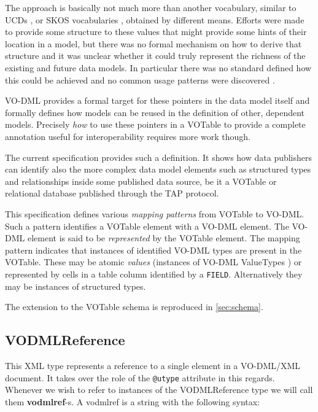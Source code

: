 \documentclass[11pt,a4paper]{ivoa}
\begin{document}
The approach is basically not much more than another vocabulary, similar
to UCDs \cite{2018ivoa.spec.0527M}, or SKOS vocabularies \cite{2009ivoa.spec.1007G}, obtained by
different means. Efforts were made to provide some structure to these
values that might provide some hints of their location in a model, but
there was no formal mechanism on how to derive that structure and it was
unclear whether it could truly represent the richness of the existing
and future data models. In particular there was no standard defined how
this could be achieved and no common usage patterns were discovered
\cite{note:utypeusage}.

VO-DML provides a formal target for these pointers in the data model
itself and formally defines how models can be reused in the definition
of other, dependent models. Precisely \emph{how} to use these pointers
in a VOTable to provide a complete annotation useful for
interoperability requires more work though.

The current specification provides such a definition. It shows how data
publishers can identify also the more complex data model elements such
as structured types and relationships inside some published data source,
be it a VOTable or relational database published through the TAP
protocol.

This specification defines various \emph{mapping patterns} from VOTable
to VO-DML. Such a pattern identifies a VOTable element with a VO-DML
element. The VO-DML element is said to be \emph{represented} by the
VOTable element. The mapping pattern indicates that instances of
identified VO-DML types are present in the VOTable. These may be atomic
\emph{values} (instances of VO-DML ValueTypes \cite{2018ivoa.spec.0910L}) or
represented by cells in a table column identified by a \texttt{FIELD}.
Alternatively they may be instances of structured types.

The extension to the VOTable schema is reproduced in \ref{sec:schema}.

\subsection{VODMLReference}\label{sec:vodmlref}

This XML type represents a reference to a single element in a VO-DML/XML
document. It takes over the role of the \texttt{@utype} attribute in this
regards. Whenever we wish to refer to instances of the VODMLReference
type we will call them \textbf{vodmlref}-s. A vodmlref is a string with
the following syntax:
\end{document}
